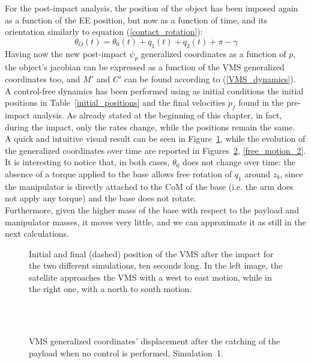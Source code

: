 \documentclass[a4paper,12pt,oneside]{report}
\begin{document}
For the post-impact analysis, the position of the object has been imposed again as a function of the EE position, but now as a function of time, and its orientation similarly to equation (\ref{contact_rotation}):
\begin{equation}
  \theta_O(t)=\theta_0(t)+q_1(t)+q_2(t)+\pi-\gamma
\end{equation}
Having now the new post-impact $\psi_p$ generalized coordinates as a function of $p$, the object's jacobian can be expressed as a function of the VMS generalized coordinates too, and $M'$ and $C'$ can be found according to (\ref{VMS_dynamics}).\\
A control-free dynamics has been performed using as initial conditions the initial positions in Table~\ref{initial_positions} and the final velocities $\dot{p}_f$ found in the pre-impact analysis. As already stated at the beginning of this chapter, in fact, during the impact, only the rates change, while the positions remain the same.\\
A quick and intuitive visual result can be seen in Figure~\ref{no_control_result}, while the evolution of the generalized coordinates over time are reported in Figures~\ref{free_motion_1}, \ref{free_motion_2}.\\
It is interesting to notice that, in both cases, $\theta_0$ does not change over time: the absence of a torque applied to the base allows free rotation of $q_1$ around $z_b$, since the manipulator is directly attached to the CoM of the base (i.e. the arm does not apply any torque) and the base does not rotate.\\
Furthermore, given the higher mass of the base with respect to the payload and manipulator masses, it moves very little, and we can approximate it as still in the next calculations.\\
\begin{figure}[!htb]
  \centering
  \caption{Initial and final (dashed) position of the VMS after the impact for the two different simulations, ten seconds long. In the left image, the satellite approaches the VMS with a west to east motion, while in the right one, with a north to south motion.}
  \label{no_control_result}
\end{figure}
\begin{figure}[!htb]
  \centering
  \subfloat
  {} \quad
\subfloat
  {} \\
  \subfloat
  {} \quad
  \subfloat
  {}\\
  \subfloat
  {}
  \caption{VMS generalized coordinates' displacement after the catching of the payload when no control is performed, Simulation~1.}
  \label{free_motion_1}
\end{figure}
\end{document}
